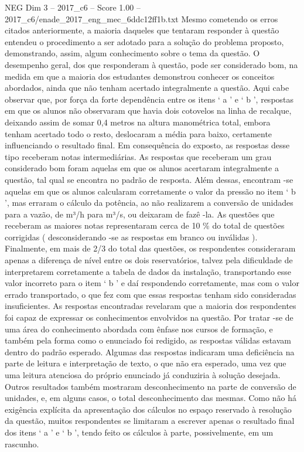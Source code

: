 \begin{textsample}{NEG Dim 3 – 2017\_c6 – Score 1.00 – 2017\_c6/enade\_2017\_eng\_mec\_6ddc12ff1b.txt}
Mesmo cometendo os erros citados anteriormente, a maioria daqueles que tentaram responder à questão entendeu o procedimento a ser adotado para a solução do problema proposto, demonstrando, assim, algum conhecimento sobre o tema da questão.
O desempenho geral, dos que responderam à questão, pode ser considerado bom, na medida em que a maioria dos estudantes demonstrou conhecer os conceitos abordados, ainda que não tenham acertado integralmente a questão.
Aqui cabe observar que, por força da forte dependência entre os itens ‘ a ’ e ‘ b ’, respostas em que os alunos não observaram que havia dois cotovelos na linha de recalque, deixando assim de somar 0,4 metros na altura manométrica total, embora tenham acertado todo o resto, deslocaram a média para baixo, certamente influenciando o resultado final.
Em consequência do exposto, as respostas desse tipo receberam notas intermediárias.
As respostas que receberam um grau considerado bom foram aquelas em que os alunos acertaram integralmente a questão, tal qual se encontra no padrão de resposta.
Além dessas, encontram -se aquelas em que os alunos calcularam corretamente o valor da pressão no item ‘ b ’, mas erraram o cálculo da potência, ao não realizarem a conversão de unidades para a vazão, de m³/h para m³/s, ou deixaram de fazê -la.
As questões que receberam as maiores notas representaram cerca de 10 \% do total de questões corrigidas ( desconsiderando -se as respostas em branco ou inválidas ).
Finalmente, em mais de 2/3 do total das questões, os respondentes consideraram apenas a diferença de nível entre os dois reservatórios, talvez pela dificuldade de interpretarem corretamente a tabela de dados da instalação, transportando esse valor incorreto para o item ‘ b ’ e daí respondendo corretamente, mas com o valor errado transportado, o que fez com que essas respostas tenham sido consideradas insuficientes.
As respostas encontradas revelaram que a maioria dos respondentes foi capaz de expressar os conhecimentos envolvidos na questão.
Por tratar -se de uma área do conhecimento abordada com ênfase nos cursos de formação, e também pela forma como o enunciado foi redigido, as respostas válidas estavam dentro do padrão esperado.
Algumas das respostas indicaram uma deficiência na parte de leitura e interpretação de texto, o que não era esperado, uma vez que uma leitura atenciosa do próprio enunciado já conduziria à solução desejada.
Outros resultados também mostraram desconhecimento na parte de conversão de unidades, e, em alguns casos, o total desconhecimento das mesmas.
Como não há exigência explícita da apresentação dos cálculos no espaço reservado à resolução da questão, muitos respondentes se limitaram a escrever apenas o resultado final dos itens ‘ a ’ e ‘ b ’, tendo feito os cálculos à parte, possivelmente, em um rascunho.

\end{textsample}
